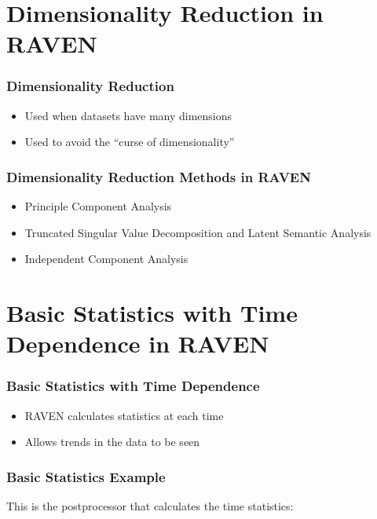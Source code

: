 \documentclass{beamer}
\begin{document}
\section{Dimensionality Reduction in RAVEN}

\begin{frame}
  \frametitle{Dimensionality Reduction}
  \begin{itemize}
  \item Used when datasets have many dimensions
  \item Used to avoid the ``curse of dimensionality''
  \end{itemize}
\end{frame}

\begin{frame}
  \frametitle{Dimensionality Reduction Methods in RAVEN}
  \begin{itemize}
  \item Principle Component Analysis
  \item Truncated Singular Value Decomposition and Latent Semantic Analysis
  \item Independent Component Analysis
  \end{itemize}
\end{frame}


\section{Basic Statistics with Time Dependence in RAVEN}

\begin{frame}
  \frametitle{Basic Statistics with Time Dependence}
  \begin{itemize}
  \item RAVEN calculates statistics at each time
  \item Allows trends in the data to be seen
  \end{itemize}
\end{frame}

\begin{frame}[fragile]
  \frametitle{Basic Statistics Example}
  This is the postprocessor that calculates the time statistics:
  

\end{frame}
\end{document}
